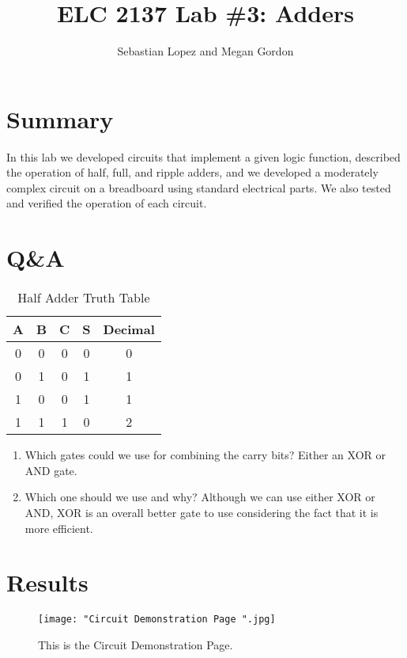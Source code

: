 \documentclass[11pt]{article}
\begin{document}
\title{ELC 2137 Lab \#3: Adders}
\author{Sebastian Lopez and Megan Gordon}

\maketitle


\section*{Summary}

In this lab we developed circuits that implement a given logic function, described the operation of half, full, and ripple adders, and we developed a moderately complex circuit on a breadboard using standard electrical parts. We also tested and verified the operation of each circuit. 

\section*{Q\&A}

\begin{table}[ht]\centering
	\caption{Half Adder Truth Table}
	\label{tbl:Logic_Truth_Table}
	\begin{tabular}{cc||cc||c}
		\toprule
		A & B & C & S & Decimal\\
		\midrule
		0 & 0 & 0 & 0 & 0\\
		0 & 1 & 0 & 1 & 1\\
		1 & 0 & 0 & 1 & 1\\
		1 & 1 & 1 & 0 & 2\\
		\bottomrule
	\end{tabular} 
\end{table} 

\begin{enumerate}
	\item Which gates could we use for combining the carry bits? 
	      Either an XOR or AND gate. 
	\item Which one should we use and why? 
		  Although we can use either XOR or AND, XOR is an overall better gate to use considering the fact that it is more efficient. 
\end{enumerate}

\section*{Results}

\begin{figure}[ht]\centering
	\texttt{[image: "Circuit Demonstration Page ".jpg]}
	\caption{This is the Circuit Demonstration Page.}
	\label{fig:circuit_demonstration}			%
\end{figure}
\end{document}
